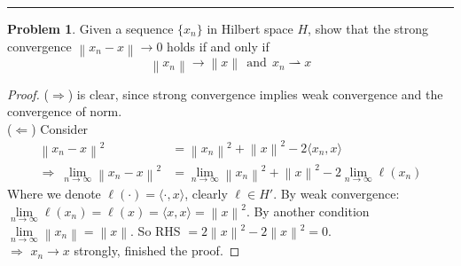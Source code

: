 \documentclass[a4paper, 10pt]{article}
\theoremstyle{definition}
\newtheorem{problem}{Problem}
\theoremstyle{hSol}
\begin{document}
\noindent\rule{16cm}{0.4pt}
\begin{problem} Given a sequence $\{x_n\}$ in Hilbert space $H$, show that the strong convergence $\left\|x_n - x\right\|\to 0$ holds if and only if
$$
\left\|x_n\right\| \to \left\|x\right\| ~~\text{and}~~x_n \rightharpoonup x
$$
\end{problem}
\begin{proof} ($\Rightarrow$) is clear, since strong convergence implies weak convergence and the convergence of norm. \\
($\Leftarrow$) Consider
\begin{equation}
  \begin{split}
    \left\|x_n - x\right\|^2 &= \left\|x_n\right\|^2 + \left\|x\right\|^2 - 2 \langle x_n, x \rangle \\
    \Rightarrow~\lim\limits_{n\rightarrow\infty} \left\|x_n - x\right\|^2 &=  \lim\limits_{n\rightarrow\infty} \left\|x_n\right\|^2 + \left\|x\right\|^2 - 2 \lim\limits_{n\rightarrow\infty}\ell(x_n)
  \end{split}
\end{equation}
Where we denote $\ell(\cdot)=\langle \cdot, x \rangle$, clearly $\ell\in H'$. By weak convergence: $\lim\limits_{n\rightarrow\infty}\ell(x_n) = \ell(x) = \langle x,x \rangle=\left\|x\right\|^2$. By another condition $\lim\limits_{n\rightarrow\infty}\left\|x_n\right\| = \left\|x\right\|$. So RHS $= 2 \left\|x\right\|^2 - 2 \left\|x\right\|^2 = 0$. \\
$\Rightarrow$ $x_n \to x$ strongly, finished the proof.
\end{proof}
\end{document}
